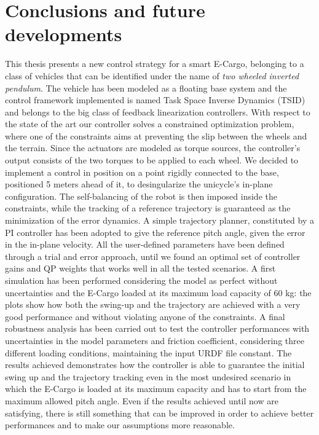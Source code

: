 \chapter{Conclusions and future developments}
\label{ch:conclusions}%

This thesis presents a new control strategy for a smart E-Cargo, belonging to a class of vehicles that can be identified under the name of \textit{two wheeled inverted pendulum}. The vehicle has been modeled as a floating base system and the control framework implemented is named Task Space Inverse Dynamics (TSID) and belongs to the big class of feedback linearization controllers.
With respect to the state of the art our controller solves a constrained optimization problem, where one of the constraints aims at preventing the slip between the wheels and the terrain. 
Since the actuators are modeled as torque sources, the controller's output consists of the two torques to be applied to each wheel.
We decided to implement a control in position on a point rigidly connected to the base, positioned 5 meters ahead of it, to desingularize the unicycle's in-plane configuration.
The self-balancing of the robot is then imposed inside the constraints, while the tracking of a reference trajectory is guaranteed as the minimization of the error dynamics.
A simple trajectory planner, constituted by a PI controller has been adopted to give the reference pitch angle, given the error in the in-plane velocity.
All the user-defined parameters have been defined through a trial and error approach, until we found an optimal set of controller gains and QP weights that works well in all the tested scenarios.
A first simulation has been performed considering the model as perfect without uncertainties and the E-Cargo loaded at its maximum load capacity of 60 kg: the plots show how both the swing-up and the trajectory are achieved with a very good performance and without violating anyone of the constraints.
A final robustness analysis has been carried out to test the controller performances with uncertainties in the model parameters and friction coefficient, considering three different loading conditions, maintaining the input URDF file constant.
The results achieved demonstrates how the controller is able to guarantee the initial swing up and the trajectory tracking even in the most undesired scenario in which the E-Cargo is loaded at its maximum capacity and has to start from the maximum allowed pitch angle.
Even if the results achieved until now are satisfying, there is still something that can be improved in order to achieve better performances and to make our assumptions more reasonable.
